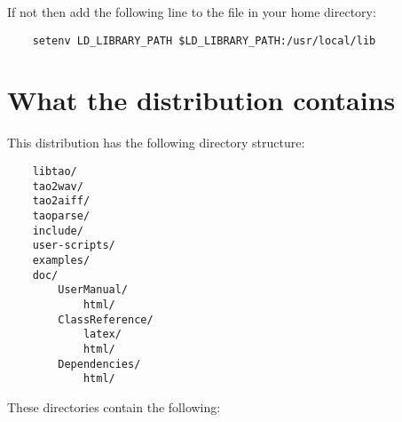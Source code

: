If not then add the following line to the  file in
your home directory:

\begin{verbatim}
    setenv LD_LIBRARY_PATH $LD_LIBRARY_PATH:/usr/local/lib
\end{verbatim}

\section{What the distribution contains}
This distribution has the following directory structure:

\begin{verbatim}
    libtao/
    tao2wav/
    tao2aiff/
    taoparse/
    include/
    user-scripts/
    examples/
    doc/
        UserManual/
            html/
        ClassReference/
            latex/
            html/
        Dependencies/
            html/
\end{verbatim}

These directories contain the following:

